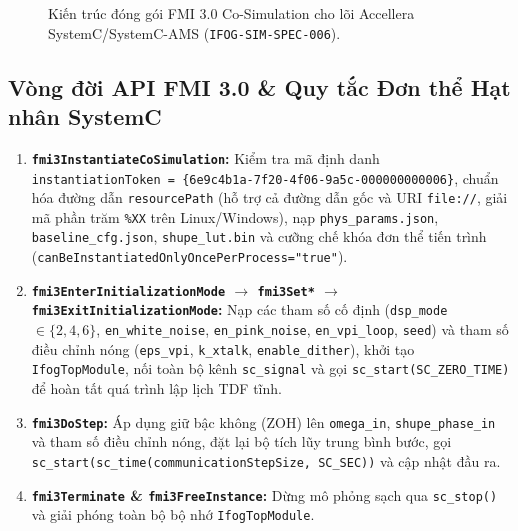 \documentclass[11pt, a4paper]{article}
\begin{document}
\begin{figure}[htbp]
\caption{Kiến trúc đóng gói FMI 3.0 Co-Simulation cho lõi Accellera SystemC/SystemC-AMS (\texttt{IFOG-SIM-SPEC-006}).}
\label{fig:fmi3_arch}
\end{figure}

\subsection{Vòng đời API FMI 3.0 \& Quy tắc Đơn thể Hạt nhân SystemC}
\begin{enumerate}
    \item \textbf{\texttt{fmi3InstantiateCoSimulation}:} Kiểm tra mã định danh \texttt{instantiationToken = \{6e9c4b1a-7f20-4f06-9a5c-000000000006\}}, chuẩn hóa đường dẫn \texttt{resourcePath} (hỗ trợ cả đường dẫn gốc và URI \texttt{file://}, giải mã phần trăm \texttt{\%XX} trên Linux/Windows), nạp \texttt{phys\_params.json}, \texttt{baseline\_cfg.json}, \texttt{shupe\_lut.bin} và cưỡng chế khóa đơn thể tiến trình (\texttt{canBeInstantiatedOnlyOncePerProcess="true"}).
    \item \textbf{\texttt{fmi3EnterInitializationMode} $\to$ \texttt{fmi3Set*} $\to$ \texttt{fmi3ExitInitializationMode}:} Nạp các tham số cố định (\texttt{dsp\_mode} $\in \{2,4,6\}$, \texttt{en\_white\_noise}, \texttt{en\_pink\_noise}, \texttt{en\_vpi\_loop}, \texttt{seed}) và tham số điều chỉnh nóng (\texttt{eps\_vpi}, \texttt{k\_xtalk}, \texttt{enable\_dither}), khởi tạo \texttt{IfogTopModule}, nối toàn bộ kênh \texttt{sc\_signal} và gọi \texttt{sc\_start(SC\_ZERO\_TIME)} để hoàn tất quá trình lập lịch TDF tĩnh.
    \item \textbf{\texttt{fmi3DoStep}:} Áp dụng giữ bậc không (ZOH) lên \texttt{omega\_in}, \texttt{shupe\_phase\_in} và tham số điều chỉnh nóng, đặt lại bộ tích lũy trung bình bước, gọi \texttt{sc\_start(sc\_time(communicationStepSize, SC\_SEC))} và cập nhật đầu ra.
    \item \textbf{\texttt{fmi3Terminate} \& \texttt{fmi3FreeInstance}:} Dừng mô phỏng sạch qua \texttt{sc\_stop()} và giải phóng toàn bộ bộ nhớ \texttt{IfogTopModule}.
\end{enumerate}
\end{document}
